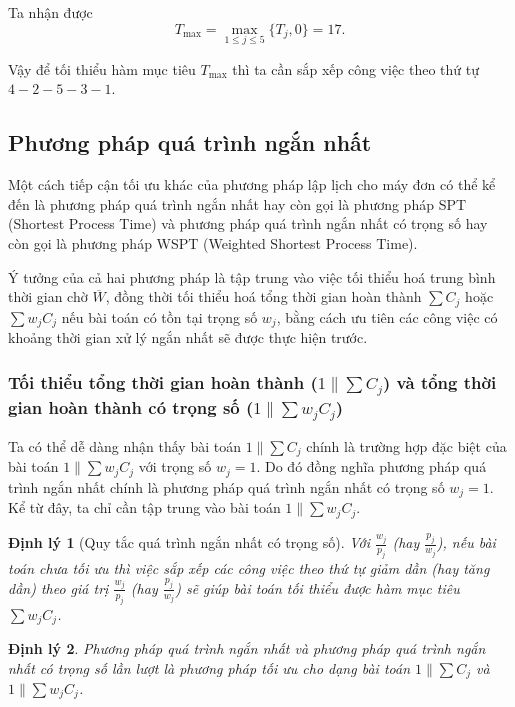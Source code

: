 \documentclass[12pt,a4paper]{report}
\newtheorem{dl}{Định lý}
\begin{document}
Ta nhận được
\begin{equation*}
	T_{\max} = \max _{1 \leq j \leq 5} \{T_j, 0\} = 17.
\end{equation*}

Vậy để tối thiểu hàm mục tiêu $T_{\max}$ thì ta cần sắp xếp công việc theo thứ tự $4-2-5-3-1$.
\subsection{Phương pháp quá trình ngắn nhất}
Một cách tiếp cận tối ưu khác của phương pháp lập lịch cho máy đơn có thể kể đến là phương pháp quá trình ngắn nhất hay còn gọi là phương pháp SPT (Shortest Process Time) và phương pháp quá trình ngắn nhất có trọng số hay còn gọi là phương pháp WSPT (Weighted Shortest Process Time).

Ý tưởng của cả hai phương pháp là tập trung vào việc tối thiểu hoá trung bình thời gian chờ $\overline{W}$, đồng thời tối thiểu hoá tổng thời gian hoàn thành $\sum C_j$ hoặc $\sum w_j C_j$ nếu bài toán có tồn tại trọng số $w_j$, bằng cách ưu tiên các công việc có khoảng thời gian xử lý ngắn nhất sẽ được thực hiện trước. 

\subsubsection*{Tối thiểu tổng thời gian hoàn thành ($1 \| \sum C_j$) và tổng thời gian hoàn thành có trọng số ($1 \| \sum w_j C_j$)}
Ta có thể dễ dàng nhận thấy bài toán $1 \| \sum C_j$ chính là trường hợp đặc biệt của bài toán $1 \| \sum w_j C_j$ với trọng số $w_j=1$. Do đó đồng nghĩa phương pháp quá trình ngắn nhất chính là phương pháp quá trình ngắn nhất có trọng số $w_j=1$. Kể từ đây, ta chỉ cần tập trung vào bài toán $1\| \sum w_j C_j$.

\begin{dl}[Quy tắc quá trình ngắn nhất có trọng số]
Với $\frac{w_j}{p_j}$ (hay $\frac{p_j}{w_j}$), nếu bài toán chưa tối ưu thì việc sắp xếp các công việc theo thứ tự giảm dần (hay tăng dần) theo giá trị $\frac{w_j}{p_j}$ (hay $\frac{p_j}{w_j}$) sẽ giúp bài toán tối thiểu được hàm mục tiêu $\sum w_j C_j$.
\end{dl}

\begin{dl}
	Phương pháp quá trình ngắn nhất và phương pháp quá trình ngắn nhất có trọng số lần lượt là phương pháp tối ưu cho dạng bài toán $1 \| \sum C_j$ và $1 \| \sum w_j C_j$.
\end{dl}
\end{document}
